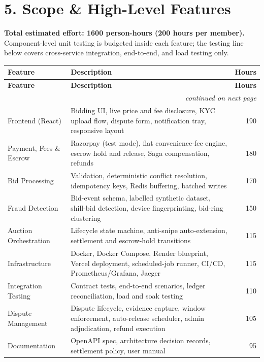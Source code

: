 \documentclass[11pt, a4paper]{article}
\begin{document}
\section*{5. Scope \& High-Level Features}

\noindent\textbf{Total estimated effort: 1600 person-hours (200 hours per member).}
Component-level unit testing is budgeted inside each feature; the testing line below covers
cross-service integration, end-to-end, and load testing only.

{\small
\begin{longtable}{@{}l p{2.9in} r@{}}
\toprule
\textbf{Feature} & \textbf{Description} & \textbf{Hours} \\
\midrule
\endfirsthead
\toprule
\textbf{Feature} & \textbf{Description} & \textbf{Hours} \\
\midrule
\endhead
\midrule
\multicolumn{3}{r}{\footnotesize\emph{continued on next page}}\\
\endfoot
\bottomrule
\endlastfoot
Frontend (React)          & Bidding UI, live price and fee disclosure, KYC upload flow, dispute form, notification tray, responsive layout & 190 \\
Payment, Fees \& Escrow   & Razorpay (test mode), flat convenience-fee engine, escrow hold and release, Saga compensation, refunds & 180 \\
Bid Processing            & Validation, deterministic conflict resolution, idempotency keys, Redis buffering, batched writes & 170 \\
Fraud Detection           & Bid-event schema, labelled synthetic dataset, shill-bid detection, device fingerprinting, bid-ring clustering & 150 \\
Auction Orchestration     & Lifecycle state machine, anti-snipe auto-extension, settlement and escrow-hold transitions & 115 \\
Infrastructure            & Docker, Docker Compose, Render blueprint, Vercel deployment, scheduled-job runner, CI/CD, Prometheus/Grafana, Jaeger & 115 \\
Integration Testing       & Contract tests, end-to-end scenarios, ledger reconciliation, load and soak testing & 110 \\
Dispute Management        & Dispute lifecycle, evidence capture, window enforcement, auto-release scheduler, admin adjudication, refund execution & 105 \\
Documentation             & OpenAPI spec, architecture decision records, settlement policy, user manual & 95 \\

\end{longtable}}
\end{document}
